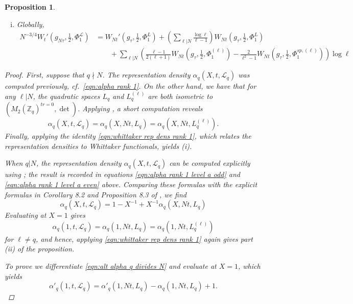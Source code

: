 \documentclass[reqno,oneside]{amsart}
\theoremstyle{plain}
\newtheorem{proposition}[theorem]{Proposition}
\theoremstyle{remark}
\numberwithin{theorem}{section}
\newcommand{\bbZ}{\mathbb Z}
\newcommand{\calL}{\mathcal L}
\begin{document}
\begin{proposition}
\begin{enumerate}[(i)]
			\item  Globally,
			\begin{align*}
			N^{-3/4}W_{t}'(g_{N\tau}, \tfrac12, \Phi^{\calL}_1)  &= W_{Nt}'(g_{\tau}, \tfrac12, \Phi^L_1) + \left( \sum_{\ell|N} \frac{\log \ell }{\ell-1} \right)W_{Nt}(g_{\tau}, \frac12, \Phi^L_1) \\
			& \qquad  + \sum_{\ell|N} \left( \frac{\ell-1}{2(\ell+1)} W_{Nt}(g_{\tau}, \tfrac12, \Phi^{(\ell)}_1) - \frac{2}{\ell^2 -1 } W_{Nt}(g_{\tau}, \tfrac12, \Phi^{sp, (\ell)}_1) \right) \log \ell
			\end{align*}
		\end{enumerate}
		\begin{proof}
			First, suppose that $q \nmid N$. The representation density $\alpha_q(X, t, \calL_q)$ was computed previously, cf.\  \eqref{eqn:alpha rank 1}. On the other hand, we have that for any $\ell | N$, the quadratic spaces $L_q$ and $L^{(\ell)}_q$ are both isometric to $(M_2(\bbZ_q)^{tr=0}, \det)$. Applying \cite[ Proposition 8.3]{YangLocal}, a short computation reveals
			\begin{equation}
			\alpha_q(X, t, \calL_q) = \alpha_q(X, Nt, L_q) = \alpha_q(X, Nt, L^{(\ell)}_q).
			\end{equation}
			Finally, applying the identity \eqref{eqn:whittaker rep dens rank 1}, which relates the representation densities to Whittaker functionals, yields \textit{(i)}.
			
			When $q|N$, the representation density $\alpha_q(X, t, \calL_q)$ can be computed explicitly using  \cite[Theorem 3.1]{YangLocal}; the result is recorded in equations \eqref{eqn:alpha rank 1 level a odd} and \eqref{eqn:alpha rank 1 level a even} above. Comparing these formulas with the explicit formulas in Corollary 8.2 and Proposition 8.3 of \cite{YangLocal}, we find
			\begin{equation} \label{eqn:alt alpha q divides N}
			\alpha_q(X, t, \calL_q) = 1 - X^{-1} + X^{-1} \alpha_q(X, Nt, L_q)
			\end{equation}
			Evaluating at $X=1$ gives
			\begin{equation}
			\alpha_q(1, t, \calL_q) = \alpha_q(1, Nt, L_q) = \alpha_q(1, Nt, L_q^{(\ell)})
			\end{equation}
			for $\ell \neq q$, and hence, applying \eqref{eqn:whittaker rep dens rank 1} again gives part \textit{(ii)} of the proposition.
			
			To prove  we differentiate  \eqref{eqn:alt alpha q divides N}  and evaluate at $X=1$, which yields
			\begin{equation}
			\alpha'_q(1, t, \calL_q) = \alpha' _q(1, Nt, L_q) - \alpha_q(1, Nt, L_q) + 1.
			\end{equation}
			

\end{proof}
\end{proposition}
\end{document}
